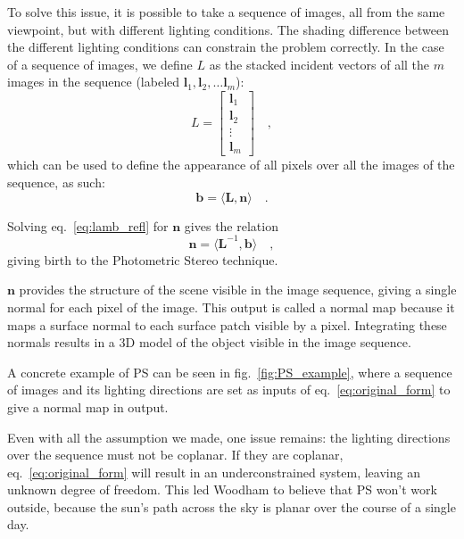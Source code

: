 \documentclass{report}
\begin{document}
To solve this issue, it is possible to take a sequence of images, all from the same viewpoint, but with different lighting conditions. The shading difference between the different lighting conditions can constrain the problem correctly. In the case of a sequence of images, we define $L$ as the stacked incident vectors of all the $m$ images in the sequence (labeled $\mathbf{l}_{1}, \mathbf{l}_{2}, \dots \mathbf{l}_{m}$):
\begin{equation}
L =
\begin{bmatrix}
    \mathbf{l}_{1} \\
    \mathbf{l}_{2} \\
    \vdots \\
    \mathbf{l}_{m}
\end{bmatrix}
\quad,
\end{equation}
which can be used to define the appearance of all pixels over all the images of the sequence, as such:
\begin{equation}
\label{eq:lamb_refl}
\mathbf{b} =  \langle  \mathbf{L}, \mathbf{n}  \rangle \quad.
\end{equation}

Solving eq.~\eqref{eq:lamb_refl} for $\mathbf{n}$ gives the relation
\begin{equation}
\label{eq:original_form}
\mathbf{n} =  \langle  \mathbf{L}^{-1}, \mathbf{b}  \rangle \quad,
\end{equation}
giving birth to the Photometric Stereo technique.

$\mathbf{n}$ provides the structure of the scene visible in the image sequence, giving a single normal for each pixel of the image. This output is called a normal map because it maps a surface normal to each surface patch visible by a pixel. Integrating these normals results in a 3D model of the object visible in the image sequence.

A concrete example of PS can be seen in fig.~\ref{fig:PS_example}, where a sequence of images and its lighting directions are set as inputs of eq.~\eqref{eq:original_form} to give a normal map in output.

Even with all the assumption we made, one issue remains: the lighting directions over the sequence must not be coplanar. If they are coplanar, eq.~\ref{eq:original_form} will result in an underconstrained system, leaving an unknown degree of freedom. This led Woodham to believe that PS won't work outside, because the sun's path across the sky is planar over the course of a single day.
\end{document}
